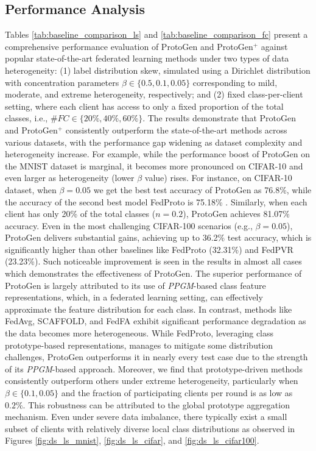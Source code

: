 \documentclass[lettersize,journal]{IEEEtran}
\begin{document}
\subsection{Performance Analysis}

Tables \ref{tab:baseline_comparison_ls} and \ref{tab:baseline_comparison_fc} present a comprehensive performance evaluation of \textsf{ProtoGen} and \textsf{ProtoGen}$^+$ against popular state-of-the-art federated learning methods under two types of data heterogeneity: (1) label distribution skew, simulated using a Dirichlet distribution with concentration parameters $\beta \in \{0.5, 0.1, 0.05\}$ corresponding to mild, moderate, and extreme heterogeneity, respectively; and (2) fixed class-per-client setting, where each client has access to only a fixed proportion of the total classes, i.e., $\#FC \in \{20\%, 40\%, 60\% \}$.
The results demonstrate that \textsf{ProtoGen} and \textsf{ProtoGen}$^+$ consistently outperform the state-of-the-art methods across various datasets, with the performance gap widening as dataset complexity and heterogeneity increase. For example, while the performance boost of \textsf{ProtoGen} on the MNIST dataset is marginal, it becomes more pronounced on CIFAR-10 and even larger as heterogeneity (lower $\beta$ value) rises. For instance, on CIFAR-10 dataset, when $\beta = 0.05$ we get the best test accuracy of \textsf{ProtoGen} as 76.8\%, while the accuracy of the second best model FedProto is 75.18\% . Similarly, when each client has only 20\% of the total classes ($n = 0.2$), \textsf{ProtoGen} achieves 81.07\% accuracy. Even in the most challenging CIFAR-100 scenarios (e.g., $\beta=0.05$), \textsf{ProtoGen} delivers substantial gains, achieving up to 36.2\% test accuracy, which is significantly higher than other baselines like FedProto (32.31\%) and FedPVR (23.23\%). Such noticeable improvement is seen in the results in almost all cases which demonstrates the effectiveness of \textsf{ProtoGen}. 
The superior performance of \textsf{ProtoGen} is largely attributed to its use of \emph{PPGM}-based class feature representations, which, in a federated learning setting, can effectively approximate the feature distribution for each class. In contrast, methods like FedAvg, SCAFFOLD, and FedFA exhibit significant performance degradation as the data becomes more heterogeneous. While FedProto, leveraging class prototype-based representations, manages to mitigate some distribution challenges, \textsf{ProtoGen} outperforms it in nearly every test case due to the strength of its \emph{PPGM}-based approach.
Moreover, we find that prototype-driven methods consistently outperform others under extreme heterogeneity, particularly when $\beta \in \{0.1, 0.05\}$ and the fraction of participating clients per round is as low as $0.2\%$. This robustness can be attributed to the global prototype aggregation mechanism. Even under severe data imbalance, there typically exist a small subset of clients with relatively diverse local class distributions as observed in Figures \ref{fig:ds_ls_mnist}, \ref{fig:ds_ls_cifar}, and \ref{fig:ds_ls_cifar100}. 
\end{document}
